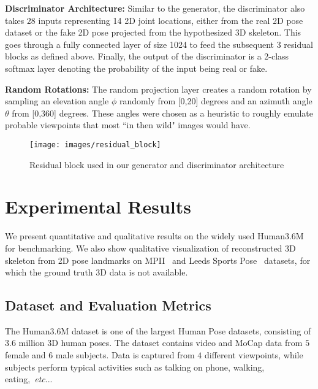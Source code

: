 \documentclass[runningheads]{llncs}
\makeatletter
\DeclareRobustCommand\onedot{\futurelet\@let@token\@onedot}
\def\@onedot{\ifx\@let@token.\else.\null\fi\xspace}
\def\etc{\emph{etc}\onedot} \def\vs{\emph{vs}\onedot}
\makeatother
\begin{document}
\textbf{Discriminator Architecture:} Similar to the generator, the discriminator also takes $28$ inputs representing 14 2D joint locations, either from the real 2D pose dataset or the fake 2D pose projected from the hypothesized 3D skeleton. This goes through a fully connected layer of size  1024 to feed the subsequent 3 residual blocks as defined above. Finally, the output of the discriminator is a 2-class softmax layer denoting the probability of the input being real or fake. 

\textbf{Random Rotations:} The random projection layer creates a random rotation by sampling an elevation angle $\phi$ randomly from [0,20] degrees and an azimuth angle $\theta$ from [0,360] degrees. These angles were chosen as a heuristic to roughly emulate probable viewpoints that most ``in then wild" images would have. 

\begin{figure}[t]
	\centering
	\texttt{[image: images/residual\_block]}
	\caption{Residual block used in our generator and discriminator architecture}
	\label{fig:residualblock}
\end{figure}

\section{Experimental Results}\label{sect:experiments}

We present quantitative and qualitative results on the widely used Human3.6M~\cite{h36m} for benchmarking. We also show qualitative visualization of reconstructed 3D skeleton from 2D pose landmarks on MPII~\cite{andriluka14cvpr} and Leeds Sports Pose~\cite{johnson2010clustered} datasets, for which the ground truth 3D data is not available.

\subsection{Dataset and Evaluation Metrics}\label{sect:dataset_metrics}

The Human3.6M dataset is one of the largest Human Pose datasets, consisting of $3.6$ million 3D human poses. The dataset contains video and MoCap data from $5$ female and $6$ male subjects. Data is captured from $4$ different viewpoints, while subjects perform typical activities such as talking on phone, walking, eating,~\etc.
\end{document}
